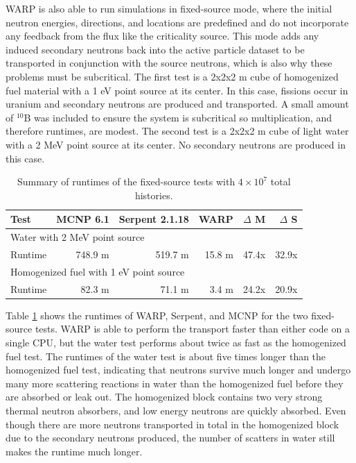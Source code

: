 WARP is also able to run simulations in fixed-source mode, where the initial neutron energies, directions, and locations are predefined and do not incorporate any feedback from the flux like the criticality source.  This mode adds any induced secondary neutrons back into the active particle dataset to be transported in conjunction with the source neutrons, which is also why these problems must be subcritical.   The first test is a 2x2x2 m cube of homogenized fuel material with a 1 eV point source at its center.  In this case, fissions occur in uranium and secondary neutrons are produced and transported.  A small amount of $^{10}$B was included to ensure the system is subcritical so multiplication, and therefore runtimes, are modest.   The second test is a 2x2x2 m cube of light water with a 2 MeV point source at its center.   No secondary neutrons are produced in this case.

\begin{table}[h]
\centering
\caption{Summary of runtimes of the fixed-source tests with $4\times10^7$ total histories.}
\label{fixed_summary}
\begin{tabular}{| l | r | r | r | r | r |}
 \hline
 Test & MCNP 6.1 & Serpent 2.1.18 & WARP & $\Delta$ M & $\Delta$ S  \\
\hline
\hline
\multicolumn{6}{|l|}{Water with 2 MeV point source }  \\
\hline
 Runtime               &  748.9 m & 519.7 m & 15.8 m & 47.4x  & 32.9x  \\
 \hline
 \hline
\multicolumn{6}{|l|}{Homogenized fuel with 1 eV point source }\\
\hline
 Runtime               &  82.3 m &  71.1 m &  3.4 m & 24.2x  & 20.9x  \\
 \hline
\end{tabular}
\end{table}

Table \ref{fixed_summary} shows the runtimes of WARP, Serpent, and MCNP for the two fixed-source tests.  WARP is able to perform the transport faster than either code on a single CPU, but the water test performs about twice as fast as the homogenized fuel test.  The runtimes of the water test is about five times longer than the homogenized fuel test, indicating that neutrons survive much longer and undergo many more scattering reactions in water than the homogenized fuel before they are absorbed or leak out.  The homogenized block contains two very strong thermal neutron absorbers, and low energy neutrons are quickly absorbed.  Even though there are more neutrons transported in total in the homogenized block due to the secondary neutrons produced, the number of scatters in water still makes the runtime much longer.

